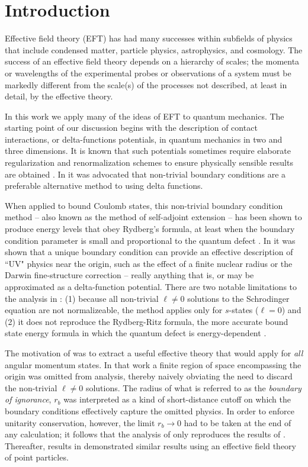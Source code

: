 \documentclass[pra,twocolumn,nofootinbib, superscriptaddress]{revtex4}%
\def\sec#1{\section{#1} }
\begin{document}
\sec{Introduction}\label{Sec:intro}

Effective field theory (EFT) has had many successes within subfields of physics that include condensed matter, particle physics, astrophysics, and cosmology.  The success of an effective field theory depends on a hierarchy of scales; the momenta or wavelengths of the experimental probes or observations of a system must be markedly different from the scale(s) of the processes not described, at least in detail, by the effective theory.

In this work we apply many of the ideas of EFT to quantum mechanics. The starting point of our discussion begins with the description of contact interactions, or delta-functions potentials, in quantum mechanics in two and three dimensions. It is known that such potentials sometimes require elaborate regularization and renormalization schemes to ensure physically sensible results are obtained  \cite{jackiw1995diverse}.  In  \cite{jackiw1995diverse} it was advocated that non-trivial boundary conditions are a preferable alternative method to using delta functions.

When applied to bound Coulomb states, this non-trivial boundary condition method -- also known as the method of self-adjoint extension -- has been shown to produce energy levels that obey Rydberg's formula, at least when the boundary condition parameter is small and proportional to the quantum defect \cite{BeckThesis}. In \cite{BeckThesis} it was shown that a unique boundary condition can provide an effective description of ``UV" physics near the origin, such as the effect of a finite nuclear radius or the Darwin fine-structure correction -- really anything that is, or may be approximated as a delta-function potential. There are two notable limitations to the analysis in \cite{BeckThesis}: (1) because all non-trivial $\ell\neq0$ solutions to the Schrodinger equation are not normalizeable, the method applies only for $s$-states ($\ell=0$) and (2) it does not reproduce the Rydberg-Ritz formula, the more accurate bound state energy formula in which the quantum defect is energy-dependent \cite{gallagher_1994}.


The motivation of \cite{Jacobs:2015han} was to extract a useful effective theory that would apply for \emph{all} angular momentum states.  In that work a finite region of space encompassing the origin was omitted from analysis, thereby naively obviating the need to discard the non-trivial $\ell\neq0$ solutions. The radius of what is referred to as the \emph{boundary of ignorance}, $r_b$ was interpreted as a kind of short-distance cutoff on which the boundary conditions effectively capture the omitted physics. In order to enforce unitarity conservation, however, the limit $r_b\to 0$ had to be taken at the end of any calculation; it follows that the analysis of \cite{Jacobs:2015han} only reproduces the results of \cite{BeckThesis}. Thereafter, results in \cite{Burgess:2016lal, Burgess:2016ddi} demonstrated similar results using an effective field theory of point particles. 
\end{document}
